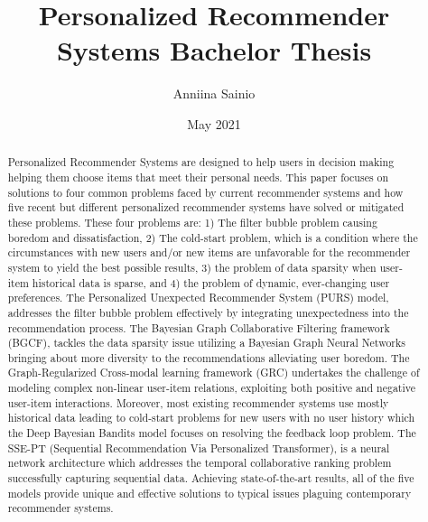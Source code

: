 \documentclass[english,twoside,censored,tkt,sw-line]{HYthesisML}
\title{
Personalized Recommender Systems
        Bachelor Thesis}
\author{Anniina Sainio}
\date{May 2021}
\begin{document}
\maketitle
\begin{otherlanguage}{english}
\begin{abstract}
Personalized Recommender Systems are designed to help users in decision making helping them choose items that meet their personal needs. This paper focuses on solutions to four common problems faced by current recommender systems and how five recent but different personalized recommender systems have solved or mitigated these problems. These four problems are: 1) The filter bubble problem causing boredom and dissatisfaction, 2) The cold-start problem, which is a condition where the circumstances  with new users and/or new items are unfavorable for the recommender system to yield the best possible results, 3) the problem of data sparsity when user-item historical data is sparse, and 4) the problem of dynamic, ever-changing user preferences. The Personalized Unexpected Recommender System (PURS) model, addresses the filter bubble problem effectively by integrating unexpectedness into the recommendation process. The Bayesian Graph Collaborative Filtering framework (BGCF), tackles the data sparsity issue utilizing a Bayesian Graph Neural Networks bringing about more diversity to the recommendations alleviating user boredom. The Graph-Regularized Cross-modal learning framework (GRC) undertakes the challenge of modeling complex non-linear user-item relations, exploiting both positive and negative user-item interactions. Moreover, most existing recommender systems use mostly historical data leading to cold-start problems for new users with no user history which the Deep Bayesian Bandits model focuses on resolving the feedback loop problem. The SSE-PT (Sequential Recommendation Via Personalized Transformer), is a neural network architecture which addresses the temporal collaborative ranking problem successfully capturing sequential data. Achieving state-of-the-art results, all of the five models provide unique and effective solutions to typical issues plaguing contemporary recommender systems.
\end{abstract}
\end{otherlanguage}

\newpage
\mytableofcontents
\frontmatter
\mainmatter

{}  
\printbibliography
\end{document}
